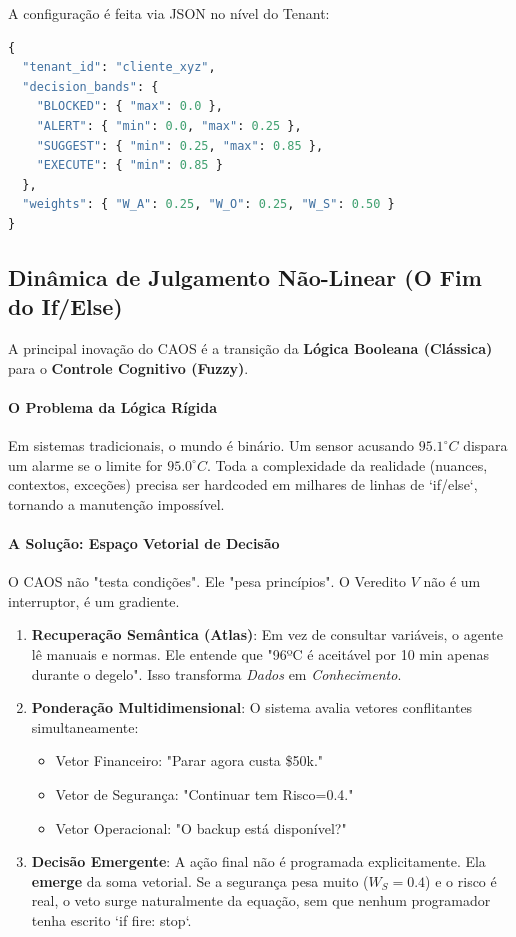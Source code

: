 \documentclass[12pt, a4paper]{article}
\begin{document}
A configuração é feita via JSON no nível do Tenant:

\begin{lstlisting}[language=Python, caption=Exemplo de Configuração de Thresholds, basicstyle=\tiny\ttfamily]
{
  "tenant_id": "cliente_xyz",
  "decision_bands": {
    "BLOCKED": { "max": 0.0 },
    "ALERT": { "min": 0.0, "max": 0.25 },
    "SUGGEST": { "min": 0.25, "max": 0.85 },
    "EXECUTE": { "min": 0.85 }
  },
  "weights": { "W_A": 0.25, "W_O": 0.25, "W_S": 0.50 }
}
\end{lstlisting}

\subsection{Dinâmica de Julgamento Não-Linear (O Fim do If/Else)}
A principal inovação do CAOS é a transição da \textbf{Lógica Booleana (Clássica)} para o \textbf{Controle Cognitivo (Fuzzy)}.

\paragraph{O Problema da Lógica Rígida}
Em sistemas tradicionais, o mundo é binário. Um sensor acusando $95.1^\circ C$ dispara um alarme se o limite for $95.0^\circ C$. Toda a complexidade da realidade (nuances, contextos, exceções) precisa ser hardcoded em milhares de linhas de `if/else`, tornando a manutenção impossível.

\paragraph{A Solução: Espaço Vetorial de Decisão}
O CAOS não "testa condições". Ele "pesa princípios".
O Veredito $V$ não é um interruptor, é um gradiente.
\begin{enumerate}
    \item \textbf{Recuperação Semântica (Atlas)}: Em vez de consultar variáveis, o agente lê manuais e normas. Ele entende que "96ºC é aceitável por 10 min apenas durante o degelo". Isso transforma \textit{Dados} em \textit{Conhecimento}.
    \item \textbf{Ponderação Multidimensional}: O sistema avalia vetores conflitantes simultaneamente:
    \begin{itemize}
        \item Vetor Financeiro: "Parar agora custa \$50k."
        \item Vetor de Segurança: "Continuar tem Risco=0.4."
        \item Vetor Operacional: "O backup está disponível?"
    \end{itemize}
    \item \textbf{Decisão Emergente}: A ação final não é programada explicitamente. Ela \textbf{emerge} da soma vetorial. Se a segurança pesa muito ($W_S=0.4$) e o risco é real, o veto surge naturalmente da equação, sem que nenhum programador tenha escrito `if fire: stop`.
\end{enumerate}
\end{document}
